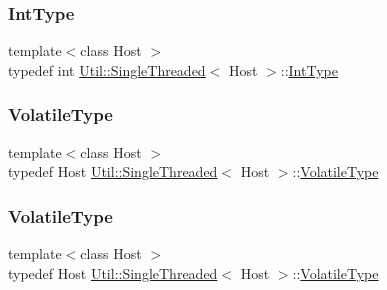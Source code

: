 \subsubsection{\texorpdfstring{IntType}{IntType}\hspace{0.1cm}{\footnotesize\ttfamily [2/2]}}
{\footnotesize\ttfamily template$<$class Host $>$ \\
typedef int \mbox{\hyperlink{classUtil_1_1SingleThreaded}{Util\+::\+Single\+Threaded}}$<$ Host $>$\+::\mbox{\hyperlink{classUtil_1_1SingleThreaded_a35932213fb0c15a7b67ced79bc2af4c6}{Int\+Type}}}

\mbox{\label{classUtil_1_1SingleThreaded_a2181651ae6fb27288205435da7c5df22}} 
\subsubsection{\texorpdfstring{VolatileType}{VolatileType}\hspace{0.1cm}{\footnotesize\ttfamily [1/2]}}
{\footnotesize\ttfamily template$<$class Host $>$ \\
typedef Host \mbox{\hyperlink{classUtil_1_1SingleThreaded}{Util\+::\+Single\+Threaded}}$<$ Host $>$\+::\mbox{\hyperlink{classUtil_1_1SingleThreaded_a2181651ae6fb27288205435da7c5df22}{Volatile\+Type}}}

\mbox{\label{classUtil_1_1SingleThreaded_a2181651ae6fb27288205435da7c5df22}} 
\subsubsection{\texorpdfstring{VolatileType}{VolatileType}\hspace{0.1cm}{\footnotesize\ttfamily [2/2]}}
{\footnotesize\ttfamily template$<$class Host $>$ \\
typedef Host \mbox{\hyperlink{classUtil_1_1SingleThreaded}{Util\+::\+Single\+Threaded}}$<$ Host $>$\+::\mbox{\hyperlink{classUtil_1_1SingleThreaded_a2181651ae6fb27288205435da7c5df22}{Volatile\+Type}}}



